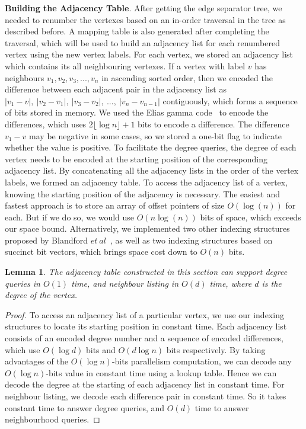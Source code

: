 \documentclass[12pt,glossary]{dalthesis}
\newtheorem{lemma}[theorem]{Lemma}
\begin{document}
\textbf{Building the Adjacency Table}. After getting the edge separator tree, we needed to renumber the vertexes based on an in-order traversal in the tree as described before. A mapping table is also generated after completing the traversal, which will be used to build an adjacency list for each renumbered vertex using the new vertex labels. For each vertex, we stored an adjacency list which contains its all neighbouring vertexes. If a vertex with label $v$ has neighbours $v_{1}, v_{2}, v_{3}, ...,v_{n}$ in ascending sorted order, then we encoded the difference between each adjacent pair in the adjacency list as $|v_{1}-v|, \ |v_{2}-v_{1}|,\  |v_{3}-v_{2}|,\ ...,\ |v_{n}-v_{n-1}|$ contiguously, which forms a sequence of bits stored in memory. We used the Elias gamma code~\cite{Gamma} to encode the differences, which uses $2\lfloor \log n \rfloor + 1$ bits to encode a difference. The difference $v_{1} - v$ may be negative in some cases, so we stored a one-bit flag to indicate whether the value is positive. To facilitate the degree queries, the degree of each vertex needs to be encoded at the starting position of the corresponding adjacency list. By concatenating all the adjacency lists in the order of the vertex labels, we formed an adjacency table. To access the adjacency list of a vertex, knowing the starting position of the adjacency is necessary. The easiest and fastest approach is to store an array of offset pointers of size $O(\log (n))$ for each. But if we do so, we would use $O(n\log (n))$ bits of space, which exceeds our space bound. Alternatively, we implemented two other indexing structures proposed by Blandford $et \ al$~\cite{compact-representation}, as well as two indexing structures based on succinct bit vectors, which brings space cost down to $O(n)$ bits.

\bigskip
\begin{lemma}
The adjacency table constructed in this section can support degree queries in $O(1)$ time, and neighbour
listing in $O(d)$ time, where $d$ is the degree of the vertex.
\end{lemma}
\bigskip 
\begin{proof}
To access an adjacency list of a particular vertex, we use our indexing structures to locate its starting position in constant time. Each adjacency list consists of an encoded degree number and a sequence of encoded differences, which use $O(\log d)$ bits and $O(d\log n)$ bits respectively. By taking advantages of the $O(\log n)$-bits parallelism computation, we can decode any $O(\log n)$-bits value in constant time using a lookup table. Hence we can decode the degree at the starting of each adjacency list in constant time. For neighbour listing, we decode each difference pair in constant time. So it takes constant time to answer degree queries, and $O(d)$ time to answer neighbourhood queries.
\end{proof}
\end{document}
